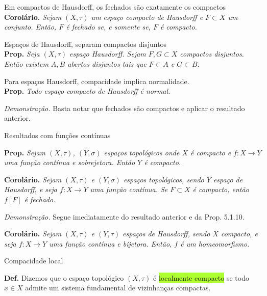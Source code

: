 \documentclass{article}
\begin{document}
\begin{landscape}
\begin{multicols}{3}
\color{Emerald}Em compactos de Hausdorff, os fechados são exatamente os compactos\\
\color{black}
\textbf{Corolário.}\textit{ Sejam \((X, \tau)\) um espaço compacto de Hausdorff e \(F \subset X\) um conjunto. Então, \(F\) é fechado se, e somente se, \(F\) é compacto.}\medskip

\color{Emerald}Espaços de Hausdorff, separam compactos disjuntos \\
\color{black}
\textbf{Prop.} \textit{Seja \((X, \tau)\) espaço Hausdorff. Sejam \(F, G \subset X\) compactos disjuntos. Então existem \(A, B\) abertos disjuntos tais que \(F \subset A\) e \(G \subset B\)}.

\vspace{1em}

\color{Emerald} Para espaços Hausdorff, compacidade implica normalidade.\color{black}\\
\textbf{Prop.}\textit{ Todo espaço compacto de Hausdorff é normal.}

\textit{Demonstração.} Basta notar que fechados são compactos e aplicar o resultado anterior.  

\vspace{1em}
\colorbox{cinza}{Resultados com funções contínuas}\medskip

\textbf{Prop.} \textit{Sejam \((X, \tau)\), \((Y, \sigma)\) espaços topológicos onde \(X\) é compacto e \(f : X \to Y\) uma função contínua e sobrejetora. Então \(Y\) é compacto.}

\vspace{1em}

\textbf{Corolário.} \textit{Sejam \((X, \tau)\) e \((Y, \sigma)\) espaços topológicos, sendo \(Y\) espaço de Hausdorff, e seja \(f : X \to Y\) uma função contínua. Se \(F \subset X\) é compacto, então \(f[F]\) é fechado.}

\textit{Demonstração.} Segue imediatamente do resultado anterior e da Prop. 5.1.10.  \medskip

\textbf{Corolário.}\textit{ Sejam \((X, \tau)\) e \((Y, \tau)\) espaços de Hausdorff, sendo \(X\) compacto, e seja \(f : X \to Y\) uma função contínua e bijetora. Então, \(f\) é um homeomorfismo.}\medskip


\colorbox{cinza}{Compacidade local}\medskip

\textbf{Def.} Dizemos que o espaço topológico $(X, \tau)$ é \colorbox{GreenYellow}{localmente compacto} se todo $x \in X$ admite um sistema fundamental de vizinhanças compactas. \medskip


\end{multicols}
\end{landscape}
\end{document}
